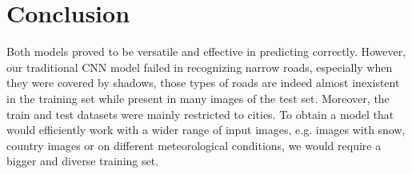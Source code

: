 \documentclass[10pt,conference,compsocconf]{IEEEtran}
\begin{document}
\section{Conclusion}
\label{sec:conclusion}
Both models proved to be versatile and effective in predicting correctly. However, our traditional CNN model failed in recognizing narrow roads, especially when they were covered by shadows, those types of roads are indeed almost inexistent in the training set while present in many images of the test set. Moreover, the train and test datasets were mainly restricted to cities. To obtain a model that would efficiently work with a wider range of input images, e.g. images with snow, country images or on different meteorological conditions, we would require a bigger and diverse training set.



\end{document}
